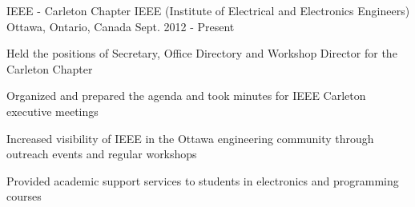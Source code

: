 

\begin{cventries}

  \cventry
    {IEEE - Carleton Chapter} %
    {IEEE (Institute of Electrical and Electronics Engineers)} %
    {Ottawa, Ontario, Canada} %
    {Sept. 2012 - Present} %
    {
      \begin{cvitems} %
        \item {Held the positions of Secretary, Office Directory and Workshop Director for the Carleton Chapter}
        \item {Organized and prepared the agenda and took minutes for IEEE Carleton executive meetings}
        \item {Increased visibility of IEEE in the Ottawa engineering community through outreach events and regular workshops}
        \item {Provided academic support services to students in electronics and programming courses}
      \end{cvitems}
    }

\end{cventries}
